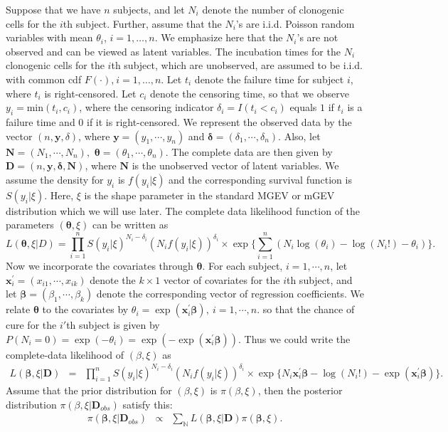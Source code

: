 \documentclass[smallextended]{svjour3}       %
\begin{document}
{Suppose that we have $n$ subjects, and let $N_{i}$ denote the number
of clonogenic cells for the $i$th subject. Further, assume that
the $N_{i}$'s are i.i.d. Poisson random variables with mean $\theta_{i}$,
$i=1,\ldots,n$. We emphasize here that the $N_{i}$'s are not observed
and can be viewed as latent variables. The incubation times
for the $N_{i}$ clonogenic cells for the $i$th subject, which
are unobserved, are assumed to be i.i.d. with common cdf $F(\cdot)$,$\ i=1,\ldots,n$. Let
$t_{i}$ denote the failure time for subject $i$, where $t_{i}$
is right-censored. Let $c_{i}$ denote the censoring time, so that
we observe $y_{i}=\mbox{min}(t_{i},c_{i})$, where the censoring
indicator $\delta_{i}=I(t_{i}<c_{i})$ equals $1$ if $t_{i}$ is
a failure time and $0$ if it is right-censored. We represent the observed
data by the vector $(n,\mathbf{y},\delta)$, where $\mathbf{y}=(y_{1},\cdots,y_{n})$
and $\mathbf{\delta}=(\delta_{1},\cdots,\delta_{n})$. Also, let $\mathbf{N}=(N_{1},\cdots,N_{n}),$
$\boldsymbol{\theta}=(\theta_{1},\cdots,\theta_{n})$. The complete data
are then given by $\mathbf{D}=(n,\mathbf{y},\mathbf{\delta},\mathbf{N})$,
where $\mathbf{N}$ is the unobserved vector of latent variables. We
assume the density for $y_{i}$ is $f(y_{i}|\xi)$ and the corresponding
survival function is $S(y_{i}|\xi).$ Here, $\xi$ is the shape parameter
in the standard MGEV or mGEV distribution which we will
use later.
The complete data likelihood function of the parameters $(\boldsymbol{\theta},\xi)$
can be written as
\begin{equation}
L(\boldsymbol{\theta},\xi|D) = \prod_{i=1}^{n}S(y_{i}|\xi)^{N_{i}-\delta_{i}}(N_{i}f(y_{i}|\xi))^{\delta_{i}}\times \exp\Big\{\sum_{i=1}^{n}(N_{i}\log(\theta_{i})-\log(N_{i}!)-\theta_{i})\Big\}.\label{eq:f}
\end{equation}
Now we incorporate the covariates through $\mathbf{\theta}$. For each
subject, $i=1,\cdots,n$, let $\mathbf{x}_{i}^{\prime}=(x_{i1},\cdots,x_{ik})$
denote the $k\times1$ vector of covariates for the $i$th subject,
and let $\boldsymbol{{\beta}}=(\beta_{1},\cdots,\beta_{k})$ denote
the corresponding vector of regression coefficients. We relate $\boldsymbol{\theta}$
to the covariates by $\theta_{i}=\exp(\mathbf{x}_{i}^{\prime}\mathbf{\beta}),\ i=1,\cdots,n.$ 
so that the chance of cure for the $i'$th subject is given by $P(N_i = 0) = \exp(-\theta_i) = \exp(-\exp(\mathbf{x}_{i}^{\prime}\mathbf{\beta}))$.
Thus we could write the complete-data likelihood of $(\beta,\xi)$
as
\begin{eqnarray}
L(\boldsymbol{\beta},\xi|\mathbf{D}) & = & \prod_{i=1}^{n}S(y_{i}|\xi)^{N_{i}-\delta_{i}}(N_{i}f(y_{i}|\xi))^{\delta_{i}}\times\exp\Big\{N_{i}\mathbf{x}_{i}^{\prime}\boldsymbol{\beta}-\log(N_{i}!)-\exp(\mathbf{x}_{i}^{\prime}\boldsymbol{\beta})\Big\}.\label{eq:h}
\end{eqnarray}
Assume that the prior distribution for $(\beta,\xi)$ is $\pi(\beta,\xi)$,
then the posterior distribution $\pi(\beta,\xi|\mathbf{D}_{obs})$
satisfy this:
\begin{eqnarray}
\pi(\mathbf{\beta},\xi|\mathbf{D}_{obs}) & \varpropto & \sum_{\mathbb{N}}L(\mathbf{\beta},\xi|\mathbb{\mathbf{D}})\pi(\mathbf{\beta},\xi).\label{eq:a}
\end{eqnarray}

}
\end{document}
